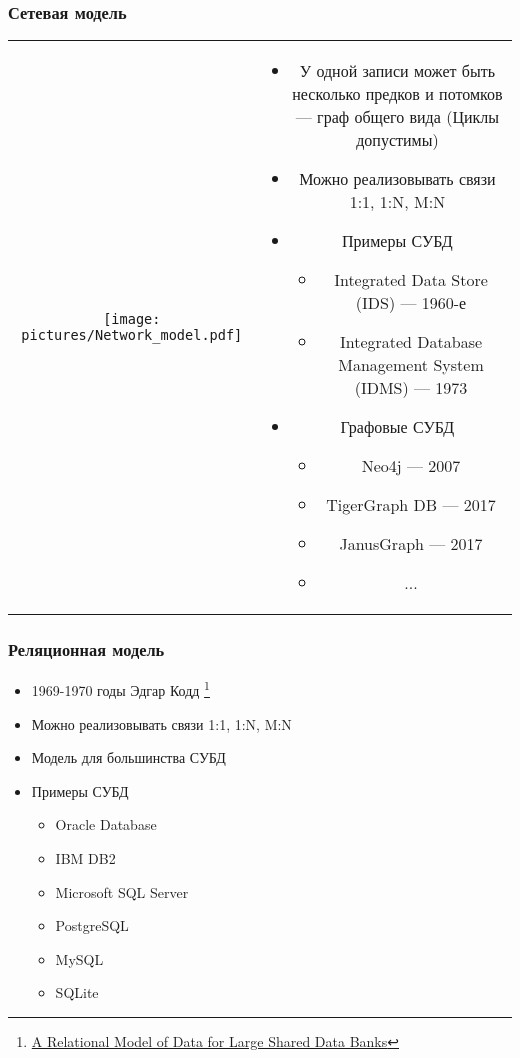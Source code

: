 \documentclass[aspectratio=169]{beamer}
\begin{document}
\begin{frame}[fragile]
  \transwipe[direction=90]
  \frametitle{Сетевая модель}
  
  \begin{tabular}{c c}
    \begin{minipage}{.4\textwidth}
      \texttt{[image: pictures/Network\_model.pdf]}
    \end{minipage}
    &
    \begin{minipage}{.55\textwidth}
      \begin{itemize}
        \item У одной записи может быть несколько предков и потомков --- граф общего вида (Циклы допустимы)
        \item Можно реализовывать связи 1:1, 1:N, M:N
        \item Примеры СУБД
          \begin{itemize}
            \item Integrated Data Store (IDS) --- 1960-е
            \item Integrated Database Management System (IDMS) --- 1973
          \end{itemize}
          \item Графовые СУБД
          \begin{itemize}
            \item Neo4j --- 2007
            \item TigerGraph DB --- 2017
            \item JanusGraph --- 2017
            \item ...
          \end{itemize}
      \end{itemize}
    \end{minipage}
  \end{tabular}
\end{frame}

\begin{frame}[fragile]
  \transwipe[direction=90]
  \frametitle{Реляционная модель}

  \begin{itemize}
    \item 1969-1970 годы Эдгар Кодд \footnote{\href{ https://www.seas.upenn.edu/~zives/03f/cis550/codd.pdf}{A Relational Model of Data for Large Shared Data Banks}}
    \item Можно реализовывать связи 1:1, 1:N, M:N
    \item Модель для большинства СУБД
    \item Примеры СУБД
      \begin{itemize}
        \item Oracle Database
        \item IBM DB2
        \item Microsoft SQL Server
        \item PostgreSQL
        \item MySQL
        \item SQLite
      \end{itemize}
  \end{itemize}
\end{frame}
\end{document}

